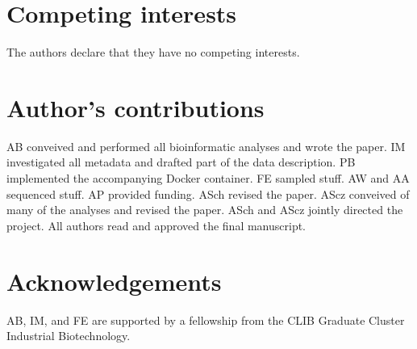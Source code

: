 \documentclass{bmcart}
\begin{document}
\begin{backmatter}

\section*{Competing interests}
The authors declare that they have no competing interests.

\section*{Author's contributions}
AB conveived and performed all bioinformatic analyses and wrote the paper.
IM investigated all metadata and drafted part of the data description.
PB implemented the accompanying Docker container.
FE sampled stuff.
AW and AA sequenced stuff.
AP provided funding.
ASch revised the paper.
AScz conveived of many of the analyses and revised the paper.
ASch and AScz jointly directed the project.
All authors read and approved the final manuscript.

\section*{Acknowledgements}
AB, IM, and FE are supported by a fellowship from the CLIB Graduate Cluster Industrial Biotechnology.




\end{backmatter}
\end{document}
